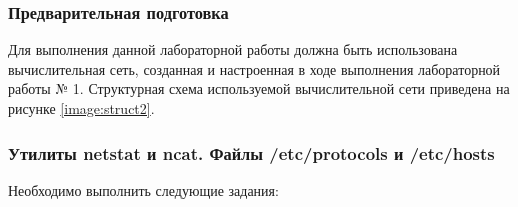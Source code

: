 
\subsubsection{Предварительная подготовка}

Для выполнения данной лабораторной работы должна быть использована вычислительная сеть, созданная и настроенная в ходе выполнения лабораторной работы № 1.
Структурная схема используемой вычислительной сети приведена на рисунке \ref{image:struct2}.


\subsubsection{Утилиты netstat и ncat. Файлы /etc/protocols и /etc/hosts}
\label{task:l2t1}

	Необходимо выполнить следующие задания:

